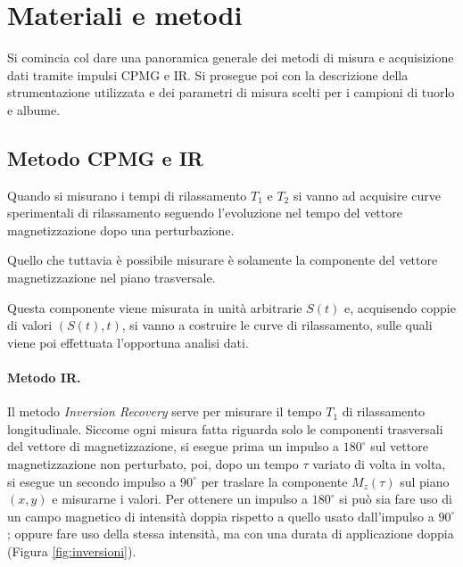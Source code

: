 \section*{Materiali e metodi}

Si comincia col dare una panoramica generale dei metodi di misura e acquisizione dati tramite impulsi CPMG e IR. Si prosegue poi con la descrizione della strumentazione utilizzata e dei parametri di misura scelti per i campioni di tuorlo e albume.

\subsection*{Metodo CPMG e IR}

Quando si misurano i tempi di rilassamento $T_1$ e $T_2$ si vanno ad acquisire curve sperimentali di rilassamento seguendo l'evoluzione nel tempo del vettore magnetizzazione dopo una perturbazione.

Quello che tuttavia è possibile misurare è solamente la componente del vettore magnetizzazione nel piano trasversale.

Questa componente viene misurata in unità arbitrarie $S(t)$ e, acquisendo coppie di valori $(S(t), t)$, si vanno a costruire le curve di rilassamento, sulle quali viene poi effettuata l'opportuna analisi dati.

\paragraph{Metodo IR.}

Il metodo \textit{Inversion Recovery} serve per misurare il tempo $T_1$ di rilassamento longitudinale. Siccome ogni misura fatta riguarda solo le componenti trasversali del vettore di magnetizzazione, si esegue prima un impulso a $180^{\circ}$ sul vettore magnetizzazione non perturbato, poi, dopo un tempo $\tau$ variato di volta in volta, si esegue un secondo impulso a $90^{\circ}$ per traslare la componente $M_z(\tau)$ sul piano $(x,y)$ e misurarne i valori. Per ottenere un impulso a $180^{\circ}$ si può sia fare uso di un campo magnetico di intensità doppia rispetto a quello usato dall'impulso a $90^{\circ}$; oppure fare uso della stessa intensità, ma con una durata di applicazione doppia (Figura \ref{fig:inversioni}).

